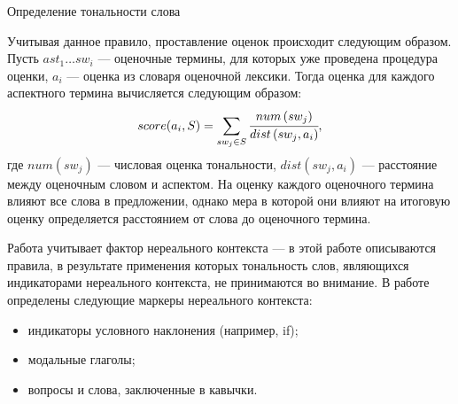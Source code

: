 \begin{algorithm}[H]
	\caption{Определение тональности слова}\label{nego-list}
	\begin{algorithmic}
		\Else
		\EndIf
		\EndProcedure
	\end{algorithmic}
\end{algorithm}

Учитывая данное правило, проставление оценок происходит следующим образом. Пусть $ast_1 \dots sw_i$ --- оценочные термины, для которых уже проведена процедура оценки, $a_i$ --- оценка из словаря оценочной лексики. Тогда оценка для каждого аспектного термина вычисляется следующим образом: 
\begin{equation}
	score(a_i, S) = \sum_{sw_j \in S}\cfrac{num\left(sw_j\right)}{dist\left( sw_j, a_i\right)},
\end{equation}
где $num\left(sw_j\right)$ --- числовая оценка тональности, $dist\left( sw_j, a_i\right)$ --- расстояние между оценочным словом и аспектом. На оценку каждого оценочного термина влияют все слова в предложении, однако мера в которой они влияют на итоговую оценку определяется расстоянием от слова до оценочного термина. 

Работа \cite{modf} учитывает фактор нереального контекста --- в этой работе описываются правила, в результате применения которых тональность слов, являющихся индикаторами нереального контекста, не принимаются во внимание. В работе определены следующие маркеры нереального контекста: 
\begin{itemize}
	\item индикаторы условного наклонения (например, if);
	\item модальные глаголы;
	\item вопросы и слова, заключенные в кавычки.
\end{itemize}


